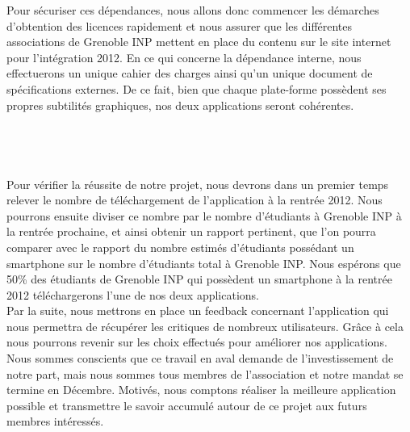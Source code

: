 \documentclass[a4paper,11px]{article}
\begin{document}
\indent Pour sécuriser ces dépendances, nous allons donc commencer les démarches d'obtention des licences rapidement et nous assurer que les différentes associations de Grenoble INP mettent en place du contenu sur le site internet pour l’intégration 2012. En ce qui concerne la dépendance interne, nous effectuerons un unique cahier des charges ainsi qu’un unique document de spécifications externes. De ce fait, bien que chaque plate-forme possèdent ses propres subtilités graphiques, nos deux applications seront cohérentes.\\
\\
\\
\\
\\
\indent Pour vérifier la réussite de notre projet, nous devrons dans un premier temps relever le nombre de téléchargement de l’application à la rentrée 2012. Nous pourrons ensuite diviser ce nombre par le nombre d'étudiants à Grenoble INP à la rentrée prochaine, et ainsi obtenir un rapport pertinent, que l'on pourra comparer avec le rapport du nombre estimés d'étudiants possédant un smartphone sur le nombre d'étudiants total à Grenoble INP. Nous espérons que 50\% des étudiants de Grenoble INP qui possèdent un smartphone à la rentrée 2012 téléchargerons l'une de nos deux applications.\\
\indent Par la suite, nous mettrons en place un feedback concernant l’application qui nous permettra de récupérer les critiques de nombreux utilisateurs. Grâce à cela nous pourrons revenir sur les choix effectués pour améliorer nos applications. Nous sommes conscients que ce travail en aval demande de l’investissement de notre part, mais nous sommes tous membres de l’association et notre mandat se termine en Décembre. Motivés, nous comptons réaliser la meilleure application possible et transmettre le savoir accumulé autour de ce projet aux futurs membres intéressés.
\end{document}
